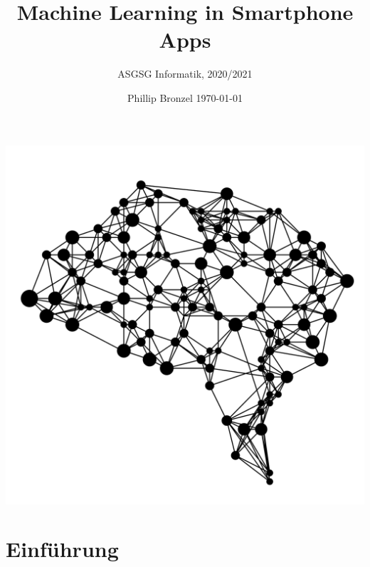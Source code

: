 \documentclass[12pt]{article}
\title{Machine Learning in Smartphone Apps}
\date{Phillip Bronzel \today}
\author{ASGSG Informatik, 2020/2021}
\begin{document}
  \maketitle
  \begin{center}
   \includegraphics[totalheight=10cm]{titlepage.png}
   \cite{titlepageimage}
  \end{center}

  \newpage
  \vspace*{\fill}
  
  \vspace*{\fill}

  \newpage
  \tableofcontents

  \newpage
  \section{Einführung}

  \newpage
  \printbibliography[heading=bibintoc, title={Literaturverzeichnis}]
\end{document}
